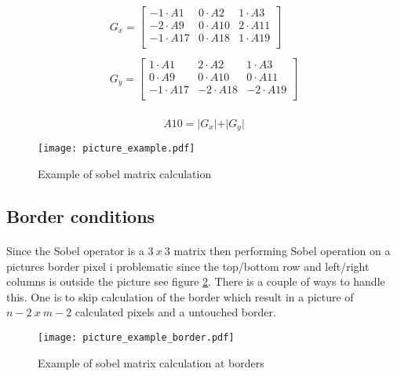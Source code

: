 \begin{equation}
\begin{array}{c}
G_x = \left[ 
\begin{array}{ccc}
	-1\cdot A1 & 0\cdot A2 & 1\cdot A3\\
    -2\cdot A9 & 0\cdot A10 & 2\cdot A11\\
    -1\cdot A17 & 0\cdot A18 & 1\cdot A19\\
\end{array} \right] \\
\\
G_y = \left[ 
\begin{array}{ccc}
	1\cdot A1 & 2\cdot A2 & 1\cdot A3\\
    0\cdot A9 & 0\cdot A10 & 0\cdot A11\\
    -1\cdot A17 & -2\cdot A18 & -2\cdot A19\\
\end{array}
\right]
\end{array}
\label{eq:sobel_calc1}
\end{equation}\\

\begin{equation}
	A10=\vert G_x\vert + \vert G_y\vert
	\label{eq:sobel_abs}
\end{equation}
 
\begin{figure}[H]
	\centering
	\texttt{[image: picture\_example.pdf]}
	\caption{Example of sobel matrix calculation}
	\label{fig:pic_matrix}
\end{figure}

\subsection{Border conditions}
\paragraph*{}
Since the Sobel operator is a $3~x~3$ matrix then performing Sobel operation on a pictures border pixel i problematic since the top/bottom row and left/right columns is outside the picture see figure \ref{fig:pic_matrix_border}. There is a couple of ways to handle this. One is to skip calculation of the border which result in a picture of $n-2~x~m-2$ calculated pixels and a untouched border. 

\begin{figure}[H]
	\centering
	\texttt{[image: picture\_example\_border.pdf]}
	\caption{Example of sobel matrix calculation at borders}
	\label{fig:pic_matrix_border}
\end{figure}

